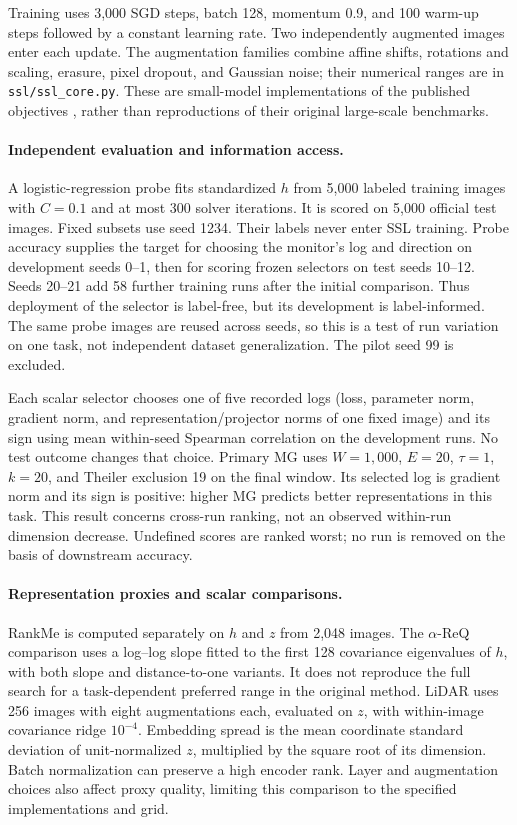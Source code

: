 {Training uses 3,000 SGD steps, batch 128, momentum 0.9, and 100 warm-up steps followed by a constant learning rate. Two independently augmented images enter each update. The augmentation families combine affine shifts, rotations and scaling, erasure, pixel dropout, and Gaussian noise; their numerical ranges are in \texttt{ssl/ssl\_core.py}. These are small-model implementations of the published objectives \citep{chen2021simsiam,grill2020byol,bardes2022vicreg,chen2020simclr}, rather than reproductions of their original large-scale benchmarks.

\paragraph{Independent evaluation and information access.}
A logistic-regression probe fits standardized $h$ from 5,000 labeled training images with $C=0.1$ and at most 300 solver iterations. It is scored on 5,000 official test images. Fixed subsets use seed 1234. Their labels never enter SSL training. Probe accuracy supplies the target for choosing the monitor's log and direction on development seeds 0--1, then for scoring frozen selectors on test seeds 10--12. Seeds 20--21 add 58 further training runs after the initial comparison. Thus deployment of the selector is label-free, but its development is label-informed. The same probe images are reused across seeds, so this is a test of run variation on one task, not independent dataset generalization. The pilot seed 99 is excluded.

Each scalar selector chooses one of five recorded logs (loss, parameter norm, gradient norm, and representation/projector norms of one fixed image) and its sign using mean within-seed Spearman correlation on the development runs. No test outcome changes that choice. Primary MG uses $W=1{,}000$, $E=20$, $\tau=1$, $k=20$, and Theiler exclusion 19 on the final window. Its selected log is gradient norm and its sign is positive: higher MG predicts better representations in this task. This result concerns cross-run ranking, not an observed within-run dimension decrease. Undefined scores are ranked worst; no run is removed on the basis of downstream accuracy.

\paragraph{Representation proxies and scalar comparisons.}
RankMe \citep{garrido2023rankme} is computed separately on $h$ and $z$ from 2,048 images. The $\alpha$-ReQ comparison \citep{agrawal2022alphareq} uses a log--log slope fitted to the first 128 covariance eigenvalues of $h$, with both slope and distance-to-one variants. It does not reproduce the full search for a task-dependent preferred range in the original method. LiDAR \citep{thilak2024lidar} uses 256 images with eight augmentations each, evaluated on $z$, with within-image covariance ridge $10^{-4}$. Embedding spread is the mean coordinate standard deviation of unit-normalized $z$, multiplied by the square root of its dimension. Batch normalization can preserve a high encoder rank. Layer and augmentation choices also affect proxy quality, limiting this comparison to the specified implementations and grid.

}
